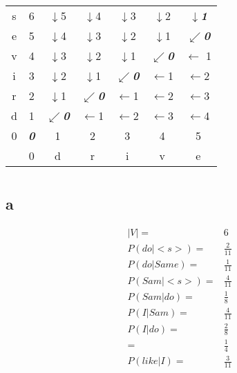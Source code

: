 \documentclass{article}
\begin{document}
\section{}
    \begin{tabular}{ccccccc}
s& 6& $\downarrow$5& $\downarrow$4& $\downarrow$3& $\downarrow$2& \emph{\textbf{$\downarrow$1}}\\
e& 5& $\downarrow$4& $\downarrow$3& $\downarrow$2& $\downarrow$1& \emph{\textbf{$\swarrow$0}}\\
v& 4& $\downarrow$3& $\downarrow$2& $\downarrow$1& \emph{\textbf{$\swarrow$0}}&$\leftarrow$ 1\\
i& 3& $\downarrow$2& $\downarrow$1& \emph{\textbf{$\swarrow$0}}& $\leftarrow$1& $\leftarrow$2\\
r& 2& $\downarrow$1& \emph{\textbf{$\swarrow$0}}& $\leftarrow$1& $\leftarrow$2& $\leftarrow$3\\
d& 1& \emph{\textbf{$\swarrow$0}}& $\leftarrow$1& $\leftarrow$2& $\leftarrow$3& $\leftarrow$4\\
0& \emph{\textbf{0}}& 1& 2& 3& 4& 5\\
 & 0& d& r& i& v& e\\
    \end{tabular}
    \section{}
    \subsection*{a}
    \begin{equation*}
        \begin{split}
            |V|=&6\\
            P(do|<s>)=&\frac{2}{11}\\
            P(do|Same)=&\frac{1}{11}\\
            P(Sam|<s>)=&\frac{4}{11}\\
            P(Sam|do)=&\frac{1}{8}\\
            P(I|Sam)=&\frac{4}{11}\\
            P(I|do)=&\frac{2}{8}\\
                    =&\frac{1}{4}\\
            P(like|I)=&\frac{3}{11}\\
        \end{split}
    \end{equation*}
\end{document}
